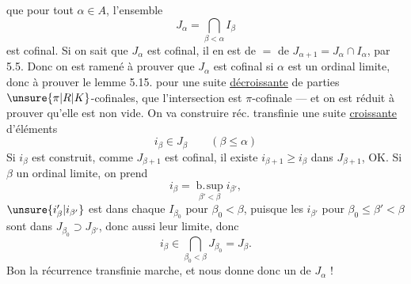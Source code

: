 que pour tout $\alpha\in A$, l'ensemble
\[
 J_\alpha=\bigcap_{\beta<\alpha}I_\beta
\]
est cofinal. Si on sait que $J_\alpha$ est cofinal, il en est de $=$ de $J_{\alpha+1}=J_\alpha\cap I_\alpha$, par 5.5. Donc on est ramené à prouver que $J_\alpha$ est cofinal si $\alpha$ est un ordinal limite, donc à prouver le lemme 5.15. pour une suite  \uline{décroissante} de parties  $\unsure{\pi|R|K}$-cofinales,     que l'intersection est $\pi$-cofinale --- et on est réduit à prouver qu'elle est non vide. On va construire  réc. transfinie une suite \uline{croissante} d'éléments
\[
 i_\beta\in J_\beta\qquad(\beta\leq\alpha)
\]
Si $i_\beta$ est construit, comme $J_{\beta+1}$ est cofinal, il existe $i_{\beta+1}\geq i_\beta$ dans $J_{\beta+1}$, OK. Si $\beta$  un ordinal limite, on prend
\[
 i_\beta=\mathop{\mathrm{b.\!sup}}\limits_{\beta'<\beta} i_{\beta'}, 
\]
$\unsure{i'_\beta|i_{\beta'}}$ est dans  chaque $I_{\beta_0}$ pour $\beta_0<\beta$,
puisque les $i_{\beta'}$ pour $\beta_0\leq\beta'<\beta$ sont  dans $J_{\beta_0}\supset J_{\beta'}$, donc aussi leur limite,   donc
\[
 i_\beta\in\bigcap_{\beta_0<\beta}J_{\beta_0}=J_\beta .
\]
Bon la récurrence transfinie marche, et nous donne donc un    de $J_\alpha$ !

